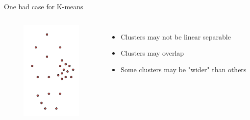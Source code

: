 \documentclass[12pt]{beamer}
\begin{document}
\begin{frame}{One bad case for K-means}
\begin{columns}[c]
\column{3cm}
\begin{figure}
\includegraphics[width=3cm]{pics/kmeans_bad_case}
\end{figure}
\column{8cm}
\begin{itemize}
	\item Clusters may not be linear separable
	\item Clusters may overlap
	\item Some clusters may be "wider" than others
\end{itemize}
\end{columns}
\end{frame}
\end{document}

